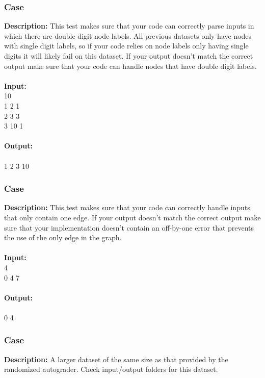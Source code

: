 \documentclass{article}
\newcommand{\code}[1]{{\fontfamily{pcr}\selectfont #1}}
\begin{document}
\subsubsection*{Case }
\hline \vspace{5}
\textbf{Description:} This test makes sure that your code can correctly parse inputs in which there are double digit node labels. All previous datasets only have nodes with single digit labels, so if your code relies on node labels only having single digits it will likely fail on this dataset. If your output doesn’t match the correct output make sure that your code can handle nodes that have double digit labels.\\ \\
\noindent \textbf{Input:}\\
\code{1 10\\1 2 1\\2 3 3\\3 10 1}\\ \\
\noindent \textbf{Output:}\\
\code{5\\1 2 3 10}
\pagebreak

\subsubsection*{Case }
\hline \vspace{5}
\textbf{Description:} This test makes sure that your code can correctly handle inputs that only contain one edge. If your output doesn’t match the correct output make sure that your implementation doesn’t contain an off-by-one error that prevents the use of the only edge in the graph.\\ \\
\noindent \textbf{Input:}\\
\code{0 4\\0 4 7}\\ \\
\noindent \textbf{Output:}\\
\code{7\\0 4}

\subsubsection*{Case }
\hline \vspace{5}
\textbf{Description:} A larger dataset of the same size as that provided by the randomized autograder. Check input/output folders for this dataset.\\ \\
\pagebreak
\end{document}
